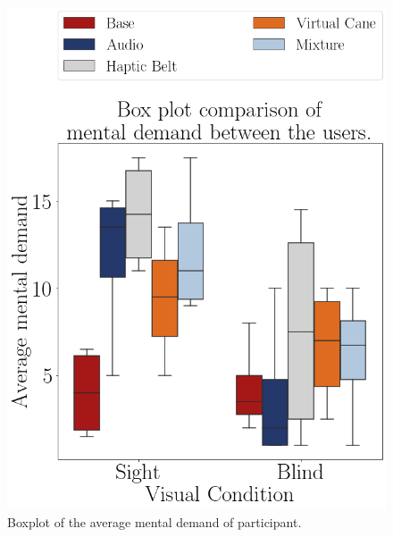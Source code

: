 \begin{figure}[!htb]
    \begin{minipage}{.45\linewidth}
        \centering
        \includegraphics[width = \linewidth]{Resultados/Nasa/Figuras/png/boxplot_md_avg_scene.png}
        \caption{Boxplot of the average mental demand of participant.}
        \label{fig:boxplot_md_scene}
    \end{minipage}
    \begin{minipage}{.1\linewidth}
        \hfill
    \end{minipage}
    \begin{minipage}{.45\linewidth}
        

\end{minipage}
\end{figure}

